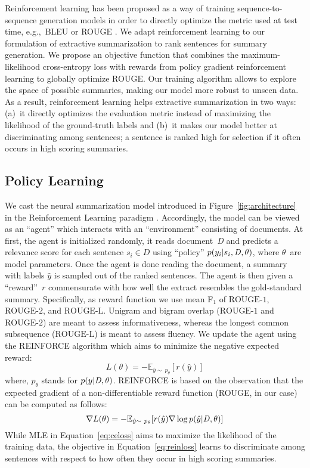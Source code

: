 \documentclass[11pt,a4paper]{article}
\newcommand\doc{{\it D }}
\begin{document}
Reinforcement learning \cite{Sutton98a} has been proposed as a way of
training sequence-to-sequence generation models in order to directly
optimize the metric used at test time, e.g.,~BLEU or ROUGE
\cite{ranzato-arxiv15-bias}. We adapt reinforcement learning to our
formulation of extractive summarization to rank sentences for summary
generation.
We propose an objective function that combines the maximum-likelihood
cross-entropy loss with rewards from policy gradient reinforcement
learning to globally optimize ROUGE. Our training algorithm allows to
explore the space of possible summaries, making our model more robust
to unseen data. As a result, reinforcement learning helps extractive
summarization in two ways: (a)~it directly optimizes the evaluation
metric instead of maximizing the likelihood of the ground-truth labels
and (b)~it makes our model better at discriminating among sentences; a
sentence is ranked high for selection if it often occurs in high
scoring summaries.



\subsection{Policy Learning}

We cast the neural summarization model introduced in
Figure~\ref{fig:architecture} in the Reinforcement Learning paradigm
\cite{Sutton98a}. Accordingly, the model can be viewed as an ``agent''
which interacts with an ``environment'' consisting of documents. At
first, the agent is initialized randomly, it reads document~\doc and
predicts a relevance score for each sentence $s_i \in D$ using
``policy'' $p(y_i | s_i,\doc,\theta)$, where $\theta$~are model
parameters. Once the agent is done reading the document, a summary
with labels $\hat{y}$ is sampled out of the ranked sentences.  The
agent is then given a ``reward''~$r$ commensurate with how well the
extract resembles the gold-standard summary. Specifically, as reward
function we use mean F$_1$ of $\mbox{ROUGE-1}$, $\mbox{ROUGE-2}$,
and $\mbox{ROUGE-L}$. Unigram and bigram overlap ($\mbox{ROUGE-1}$ and
$\mbox{ROUGE-2}$) are meant to assess informativeness, whereas the
longest common subsequence ($\mbox{ROUGE-L}$) is meant to assess
fluency.
We update the agent using the REINFORCE algorithm \cite{Williams:1992}
which aims to minimize the negative expected reward:
\begin{equation}
  L(\theta) = -\mathbb{E}_{\hat{y} \sim\ p_{\theta}}
  [r(\hat{y})] \label{eq:reinloss}
\end{equation}
where, $p_{\theta}$ stands for $p(y|\doc,\theta)$. REINFORCE is based
on the observation that the expected gradient of a non-differentiable
reward function (ROUGE, in our case) can be computed as
follows:
\begin{equation}
 \nabla L(\theta) = -\mathbb{E}_{\hat{y} \sim\ p_{\theta}} [r(\hat{y})
   \nabla \log p(\hat{y} | \doc,\theta)] \label{eq:reinlossgrad}
\end{equation}
While MLE in Equation~\eqref{eq:celoss} aims to maximize the
likelihood of the training data, the objective in
Equation~\eqref{eq:reinloss} learns to discriminate among sentences
with respect to how often they occur in high scoring summaries.
\end{document}
